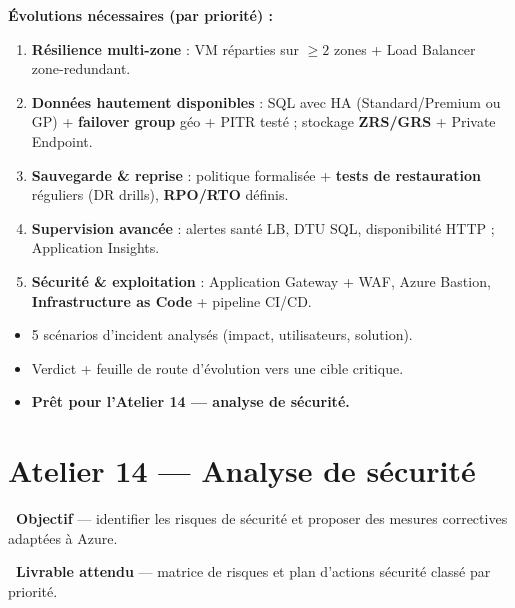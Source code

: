 \documentclass[11pt,a4paper]{article}
\newcommand{\emo}[1]{\raisebox{-0.14em}{\twemoji{#1}}}
\newcommand{\eTarget}{\emo{1f3af}}
\newcommand{\ePackage}{\emo{1f4e6}}
\begin{document}
\textbf{Évolutions nécessaires (par priorité) :}
\begin{enumerate}
  \item \textbf{Résilience multi-zone} : VM réparties sur $\geq 2$ zones + Load Balancer zone-redundant.
  \item \textbf{Données hautement disponibles} : SQL avec HA (Standard/Premium ou GP) + \textbf{failover group} géo + PITR testé ; stockage \textbf{ZRS/GRS} + Private Endpoint.
  \item \textbf{Sauvegarde \& reprise} : politique formalisée + \textbf{tests de restauration} réguliers (DR drills), \textbf{RPO/RTO} définis.
  \item \textbf{Supervision avancée} : alertes santé LB, DTU SQL, disponibilité HTTP ; Application Insights.
  \item \textbf{Sécurité \& exploitation} : Application Gateway + WAF, Azure Bastion, \textbf{Infrastructure as Code} + pipeline CI/CD.
\end{enumerate}

\begin{etatbox}
\begin{itemize}
  \item 5 scénarios d'incident analysés (impact, utilisateurs, solution).
  \item Verdict + feuille de route d'évolution vers une cible critique.
  \item \textbf{Prêt pour l'Atelier 14 — analyse de sécurité.}
\end{itemize}
\end{etatbox}


\section{Atelier 14 — Analyse de sécurité}

\begin{fiche}
\textbf{\eTarget~Objectif} — identifier les risques de sécurité et proposer des mesures correctives adaptées à Azure.

\textbf{\ePackage~Livrable attendu} — matrice de risques et plan d'actions sécurité classé par priorité.
\end{fiche}
\end{document}
